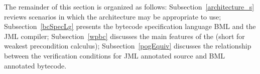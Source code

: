The remainder of this section is organized as follows: 
Subsection~\ref{architecture_s} reviews scenarios in which the architecture may be appropriate to use; 
 Subsection~\ref{bcSpecLg} presents the bytecode specification language BML and the JML compiler; Subsection~\ref{wpbc} discusses the main
features of the \wpi (short for weakest precondition calculus); Subsection~\ref{pogEquiv} discusses the relationship between the verification conditions for JML annotated source and BML annotated bytecode.















